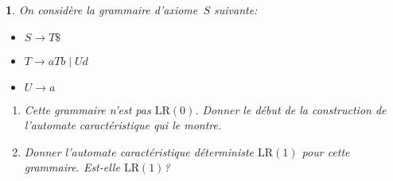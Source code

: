 \documentclass[a4paper,10pt,french]{article}
\newcommand{\LR}{\mathrm{LR}}
\def\mybox#1#2{\fbox{\parbox[b][#1][b]{#2}{~}}}
\newtheorem{exi}{}
\newenvironment{exo}{\begin{exi}\em}{\end{exi}}
\begin{document}
\begin{exo}
On considère la grammaire d'axiome~$S$ suivante:
\begin{itemize}
\item[] $S \rightarrow T\$$
\item[] $T \rightarrow aTb \mid Ud$
\item[] $U \rightarrow a$
\end{itemize}

\begin{enumerate}
\item Cette grammaire n'est pas $\LR(0)$. Donner le début de la construction
de l'automate caractéristique qui le montre.

\mybox{4cm}{\linewidth}

\item Donner l'automate caractéristique déterministe $\LR(1)$ pour cette
grammaire. Est-elle $\LR(1)$?

\mybox{9cm}{\linewidth}

\end{enumerate}

\end{exo}
\end{document}
